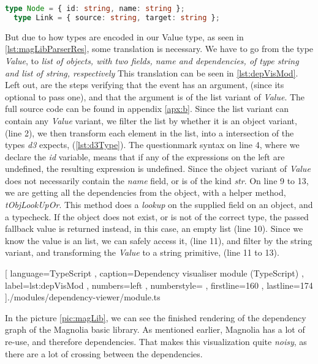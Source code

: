 \begin{lstlisting}[language = TypeScript, label=lst:d3Type]
  type Node = { id: string, name: string };
  type Link = { source: string, target: string };
\end{lstlisting}

But due to how types are encoded in our Value type, as seen in
\ref{lst:magLibParserRes}, some translation is necessary. We have to go from the
type \textit{Value}, to
\textit{
  list of objects, with two fields, name and dependencies, of type string and
  list of string, respectively}
This translation can be seen in \ref{lst:depVisMod}. Left out, are the steps
verifying that the event has an argument, (since its optional to pass one), and
that the argument is of the list variant of \textit{Value}. The full source code
can be found in appendix \ref{apx:b}. Since the list variant can contain any
\textit{Value} variant, we filter the list by whether it is an object variant,
(line 2), we then transform each element in the list, into a intersection of the
types \textit{d3} expects, (\ref{lst:d3Type}). The questionmark syntax on line
4, where we declare the \textit{id} variable, means that if any of the
expressions on the left are undefined, the resulting expression is undefined.
Since the object variant of \textit{Value} does not necessarily contain the
\textit{name} field, or is of the kind \textit{str}. On line 9 to 13, we are
getting all the dependencies from the object, with a helper method,
\textit{tObjLookUpOr}. This method does a \textit{lookup} on the supplied field
on an object, and a typecheck. If the object does not exist, or is not of the
correct type, the passed fallback value is returned instead, in this case, an
empty list (line 10). Since we know the value is an list, we can safely access
it, (line 11), and filter by the string variant, and transforming the
\textit{Value} to a string primitive, (line 11 to 13).

\begin{code}[H]
  
    [ language=TypeScript
    , caption={Dependency visualiser module (TypeScript)}
    , label=lst:depVisMod
    , numbers=left
    , numberstyle=\tiny\color{gray}
    , firstline=160
    , lastline=174
    ]{./modules/dependency-viewer/module.ts}
\end{code}

In the picture \ref{pic:magLib}, we can see the finished rendering of the
dependency graph of the Magnolia basic library. As mentioned earlier, Magnolia
has a lot of re-use, and therefore dependencies. That makes this visualization
quite \textit{noisy}, as there are a lot of crossing between the dependencies.

